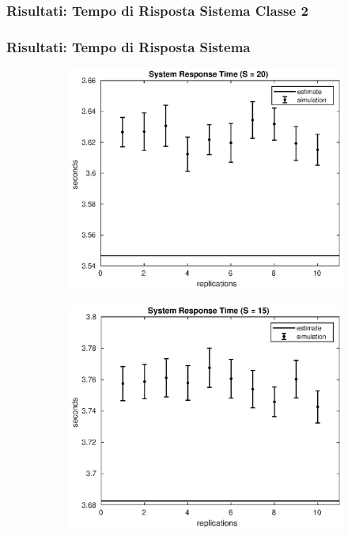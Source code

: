 \begin{frame}
\frametitle{Risultati: Tempo di Risposta Sistema Classe 2}

\end{frame}
\begin{frame}
\frametitle{Risultati: Tempo di Risposta Sistema}
%
%
\begin{figure}[!h]
\centering
%
\begin{subfigure}[t]{0.49\textwidth}
\includegraphics[width=\textwidth]{../figures/simul/20_500K_s}
\label{20_s}
\end{subfigure}
%
\begin{subfigure}[t]{0.49\textwidth}
\includegraphics[width=\textwidth]{../figures/simul/15_500K_s}

\end{subfigure}
\end{figure}
\end{frame}
